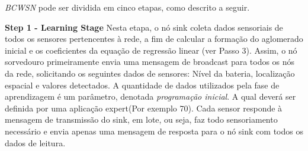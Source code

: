 \documentclass{acm_proc_article-sp}
\begin{document}



{\it BCWSN} pode ser dividida em cinco etapas, como descrito a seguir. 
\vspace*{-.3cm}

{\bf Step 1 - Learning Stage}
Nesta etapa, o nó sink coleta dados sensoriais de todos os sensores
{pertencentes à rede}, a fim de calcular a formação do aglomerado inicial e os
coeficientes da equação de regressão linear (ver Passo 3). Assim, o nó sorvedouro primeiramente envia uma mensagem de
broadcast para todos os nós da rede, solicitando os seguintes dados de sensores: Nível da bateria,
localização espacial e valores detectados. A quantidade de dados utilizados pela fase de
aprendizagem é um parâmetro, denotada \textit{programação inicial}. A qual
deverá ser definida por uma aplicação expert(Por exemplo 70). Cada sensor responde à mensagem de transmissão
do sink, em lote, ou seja, faz todo sensoriamento necessário e envia apenas uma mensagem de resposta para o
nó sink com todos os dados de leitura.
\vspace*{-.3cm}
\end{document}
